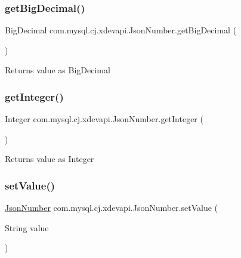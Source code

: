 \subsubsection{\texorpdfstring{get\+Big\+Decimal()}{getBigDecimal()}}
{\footnotesize\ttfamily Big\+Decimal com.\+mysql.\+cj.\+xdevapi.\+Json\+Number.\+get\+Big\+Decimal (\begin{DoxyParamCaption}{ }\end{DoxyParamCaption})}

\begin{DoxyReturn}{Returns}
value as Big\+Decimal 
\end{DoxyReturn}
\mbox{\label{classcom_1_1mysql_1_1cj_1_1xdevapi_1_1_json_number_a3e58ec83a320dff5e31a56db7f8daec1}} 
\subsubsection{\texorpdfstring{get\+Integer()}{getInteger()}}
{\footnotesize\ttfamily Integer com.\+mysql.\+cj.\+xdevapi.\+Json\+Number.\+get\+Integer (\begin{DoxyParamCaption}{ }\end{DoxyParamCaption})}

\begin{DoxyReturn}{Returns}
value as Integer 
\end{DoxyReturn}
\mbox{\label{classcom_1_1mysql_1_1cj_1_1xdevapi_1_1_json_number_ac9c9fcd92d6adf4adb303efe90ef2779}} 
\subsubsection{\texorpdfstring{set\+Value()}{setValue()}}
{\footnotesize\ttfamily \mbox{\hyperlink{classcom_1_1mysql_1_1cj_1_1xdevapi_1_1_json_number}{Json\+Number}} com.\+mysql.\+cj.\+xdevapi.\+Json\+Number.\+set\+Value (\begin{DoxyParamCaption}\item[{String}]{value }\end{DoxyParamCaption})}

